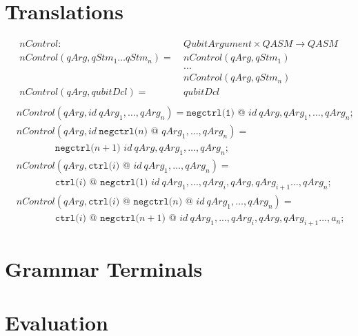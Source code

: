 \begin{appendices}
\chapter{Translations}
\label{appendix:translation}

\begin{align*}
    nControl : \ & QubitArgument \times QASM \to QASM\\
    nControl(qArg, qStm_1 \dots qStm_n) = \ & nControl(qArg, qStm_1)\\
        & ...\\
        & nControl(qArg, qStm_n)\\
    nControl(qArg, qubitDcl) = \ & qubitDcl\\
\end{align*}
\begin{align*}
    &nControl(qArg, id \ qArg_1, \dots, qArg_n ) =  \texttt{negctrl(1) @ } id \ qArg, qArg_1, \dots, qArg_n\texttt{;}\\
    &nControl(qArg, id \ \texttt{negctrl(}n\texttt{) @ } qArg_1, \dots, qArg_n ) = \\
    & \quad \quad \quad \quad \texttt{negctrl(}n + 1\texttt{) }id \ qArg, qArg_1, \dots, qArg_n\texttt{;}\\
    &nControl(qArg, \texttt{ctrl(}i \texttt{) @ } id \ qArg_1, \dots, qArg_n ) = \\
    & \quad \quad \quad \quad \texttt{ctrl(}i \texttt{) @ } \texttt{negctrl(}1\texttt{) } id \ qArg_1, ..., qArg_i, qArg, qArg_{i+1} \dots, qArg_n\texttt{;}\\
    &nControl(qArg, \texttt{ctrl(}i \texttt{) @ } \texttt{negctrl(}n\texttt{) @ } id \ qArg_1, \dots, qArg_n ) = \\
    & \quad \quad \quad \quad \texttt{ctrl(}i \texttt{) @ } \texttt{negctrl(}n + 1\texttt{) @ } id \ qArg_1, ..., qArg_i, qArg, qArg_{i+1} \dots, a_n\texttt{;}
\end{align*}

\chapter{Grammar Terminals}
\label{appendix:grammar_terminals}


\chapter{Evaluation}

\end{appendices}
